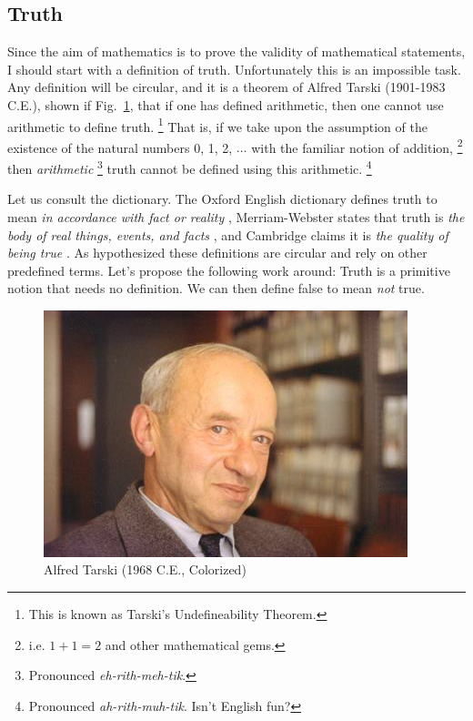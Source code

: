     \subsection{Truth}
        Since the aim of mathematics is to prove the validity of mathematical
        statements, I should start with a definition of truth.
        Unfortunately this is an impossible task. Any definition will be
        circular, and it is a theorem of Alfred Tarski
        (1901-1983 C.E.), shown if Fig.~\ref{photo:alfred_tarski}, that if
        one has defined arithmetic, then one cannot use arithmetic to define
        truth.%
        \footnote{%
            This is known as Tarski's Undefineability Theorem.%
        }
        That is, if we take upon the assumption of the existence of the
        natural numbers 0, 1, 2, $\dots$ with the familiar notion of addition,%
        \footnote{%
            i.e. $1+1=2$ and other mathematical gems.
        }
        then \textit{arithmetic}%
        \footnote{%
            Pronounced \textit{eh-rith-meh-tik}.
        }
        truth cannot be defined using this arithmetic.%
        \footnote{%
            Pronounced \textit{ah-rith-muh-tik}. Isn't English fun?
        }
        \par\hfill\par
        Let us consult the dictionary. The Oxford English dictionary defines
        truth to mean \textit{in accordance with fact or reality}
        \cite{OEDTrueDef}, Merriam-Webster states that truth is
        \textit{the body of real things, events, and facts}
        \cite{MerriamWebsterTruthDef}, and Cambridge claims it is
        \textit{the quality of being true} \cite{CambridgeTruthDef}. As
        hypothesized these definitions are circular and rely on other predefined
        terms. Let's propose the following work around: Truth is a
        primitive notion that needs no definition. We can then define
        false to mean \textit{not} true.
        \begin{figure}
            \centering
            \captionsetup{type=figure}
            \includegraphics[scale=0.5]{images/AlfredTarski1968.jpeg}
            \caption{Alfred Tarski (1968 C.E., Colorized)}
            \label{photo:alfred_tarski}
        \end{figure}
